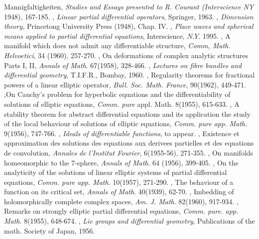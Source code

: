 \begin{thebibliography}{99}
  Mannigfaltigkeiten, \textit{Studies and Essays presented to
    R. Courant (Interscience NY} 1948), 167-185. 
, \textit{Linear partial differential
  operators}, Springer, 1963. 
, \textit{Dimension theory},
  Princetong University Press (1948), Chap. IV. 
, \textit{Place waves and spherical means
  applied to partial differential equations}, Interscience,
  $N.Y$. 1995. 
, A manifold which does not admit any
  differentiable structure, \textit{Comm, Math. Helvoetici}, 34
  (1960), 257-270. 
, On deformations of complex
  analytic structures Parts I, II, \textit{Annals of Math}. 67(1958),
  328-466. 
, \textit{Lectures on fibre bundles and
  differential geometry}, T.I.F.R., Bombay, 1960. 
, Regularity theorems for
  fractional powers of a linear elliptic operator,
  \textit{Bull. Soc. Math. France}, 90(1962), 449-471. 
,\pageoriginale On Cauchy's problem for hyperbolic equations
  and the differentiability of solutions of elliptic equations,
  \textit{Comm. pure} appl. Math. 8(1955), 615-633. 
, A stability theorem for abstract differential
  equations and its application the study of the local behaviour of
  solutions of elliptic equations, \textit{Comm. pure
    app. Math}. 9(1956), 747-766. 
, \textit{Ideals of differentiable
  functions}, to appear. 
, Existence et approximation des solutions
  des equations aux derivees partielles et des equations de
  convolution, \textit{Annales de l'Institut Fourier}, 6(1955-56),
  271-355. 
, On manifolds homeomorphic to the 7-sphere,
  \textit{Annals of Math}. 64 (1956), 399-405. 
, On the analyticity of the
  solutions of linear elliptic systems of partial differential
  equations, \textit{ Comm. pure app. Math}. 10(1957), 271-290. 
, The behaviour of a function on its
  critical set, \textit{ Annals of Math}. 40(1939), 62-70. 
, Imbedding of holomorphically complete
  complex spaces, \textit{Am. J. Math}. 82(1960), 917-934. 
, Remarks on strongly elliptic partial
  differential equations, \textit{Comm. pure. app. Math}. 8(1955),
  648-674. 
, \textit{Lie groups and differential
  geometry}, Publications of the math. Society of Japan, 1956. 

\end{thebibliography}
